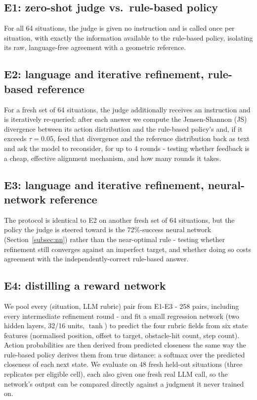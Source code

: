 \documentclass[conference]{IEEEtran}
\begin{document}
\subsection{E1: zero-shot judge vs.\ rule-based policy}
For all 64 situations, the judge is given no instruction and is called
once per situation, with exactly the information available to the
rule-based policy, isolating its raw, language-free agreement with a
geometric reference.

\subsection{E2: language and iterative refinement, rule-based reference}
For a fresh set of 64 situations, the judge additionally receives an
instruction and is iteratively re-queried: after each answer we compute
the Jensen-Shannon (JS) divergence between its action distribution and
the rule-based policy's and, if it exceeds $\tau=0.05$, feed that
divergence and the reference distribution back as text and ask the model
to reconsider, for up to 4 rounds - testing whether feedback is a cheap,
effective alignment mechanism, and how many rounds it takes.

\subsection{E3: language and iterative refinement, neural-network
reference}
The protocol is identical to E2 on another fresh set of 64 situations,
but the policy the judge is steered toward is the 72\%-success neural
network (Section~\ref{subsec:nn}) rather than the near-optimal rule -
testing whether refinement still converges against an imperfect target,
and whether doing so costs agreement with the independently-correct
rule-based answer.

\subsection{E4: distilling a reward network}
We pool every (situation, LLM rubric) pair from E1-E3 - 258 pairs,
including every intermediate refinement round - and fit a small
regression network (two hidden layers, 32/16 units, $\tanh$) to predict
the four rubric fields from six state features (normalised position,
offset to target, obstacle-hit count, step count). Action probabilities
are then derived from predicted closeness the same way the rule-based
policy derives them from true distance: a softmax over the predicted
closeness of each next state. We evaluate on 48 fresh held-out
situations (three replicates per eligible cell), each also given one
fresh real LLM call, so the network's output can be compared directly
against a judgment it never trained on.
\end{document}
